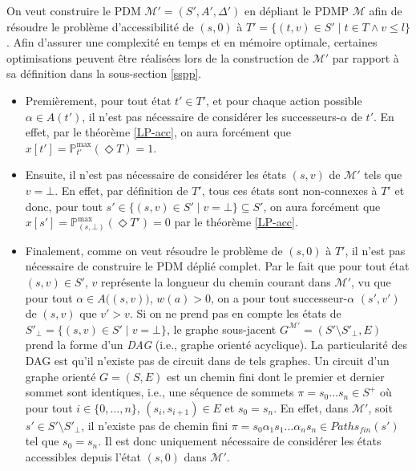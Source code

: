 \documentclass[12pt,a4paper]{report}
\theoremstyle{definition}%
\theoremstyle{remark}
\newcommand{\pr}{\mathbb{P}}
\let\labelitemi\labelitemii
\begin{document}
On veut construire le PDM $\mathcal{M}' = (S', A', \Delta')$ en dépliant
le PDMP $\mathcal{M}$ afin de résoudre le problème d'accessibilité
de $(s, 0)$ à $T' = \{ (t, v) \in S' \; | \; t \in T \wedge v \leq l \}$.
Afin d'assurer une complexité en temps et en mémoire optimale, certaines optimisations peuvent être réalisées lors de la construction de $\mathcal{M}'$ par rapport à sa définition dans la sous-section \ref{sspp}.
\begin{itemize}
	\renewcommand{\labelitemi}{\tiny$\bullet$}
	\item
Premièrement, pour tout état $t' \in T'$, et pour chaque action possible
$\alpha \in A(t')$, il n'est pas nécessaire de considérer les
successeurs-$\alpha$ de $t'$. En effet, par le théorème \ref{LP-acc}, on aura forcément que $x[t'] = \pr^{\max}_{t'}(\Diamond T) = 1$.
	\item
Ensuite, il n'est pas nécessaire de considérer les états $(s, v)$ de $\mathcal{M}'$ tels que $v = \bot$. En effet, par définition de $T'$, tous ces états sont non-connexes à $T'$ et donc, pour tout $s' \in \{ (s, v) \in S' \; | \; v = \bot \} \subseteq S'$, on aura forcément que $x[s'] = \pr^{\max}_{(s, \bot)} (\Diamond T') = 0$ par le théorème \ref{LP-acc}.
	\item
Finalement, comme on veut résoudre le problème de $(s, 0)$ à $T'$, il n'est pas
nécessaire de construire le PDM déplié complet.
Par le fait que pour tout état $(s, v) \in S'$, $v$ représente la longueur du
chemin courant dans $\mathcal{M}'$, vu que pour tout $\alpha \in A\big((s, v)\big)$,
$w(a) > 0$, on a pour tout successeur-$\alpha$ $(s', v')$ de $(s, v)$ que $v' > v$.
Si on ne prend pas
en compte les états de $S'_\bot = \{ (s, v) \in S' \; | \; v = \bot \}$,
le graphe
sous-jacent $G^{\mathcal{M}'}=(S' \setminus S'_\bot, E)$ prend la forme d'un \textit{DAG} (i.e., graphe
orienté acyclique). La particularité des DAG est qu'il n'existe
pas de circuit dans de tels graphes.
Un circuit d'un graphe orienté $G = (S, E)$ est un chemin fini dont le premier et
dernier sommet sont identiques, i.e., une séquence de sommets $\pi = s_0 \dots s_n \in S^+$ où pour tout $i \in \{0, \dots, n\}$, $(s_i, s_{i+1}) \in E$ et $s_0 = s_n$.
En effet, dans $\mathcal{M}'$, soit $s' \in S' \setminus S'_\bot$, il n'existe pas de chemin fini $\pi = s_0 \alpha_1 s_1 \dots \alpha_n s_n \in Paths_{fin}(s')$
tel que $s_0 = s_n$.
Il est donc uniquement nécessaire de considérer
les états accessibles depuis l'état $(s, 0)$ dans $\mathcal{M}'$.
\end{itemize}
\end{document}
